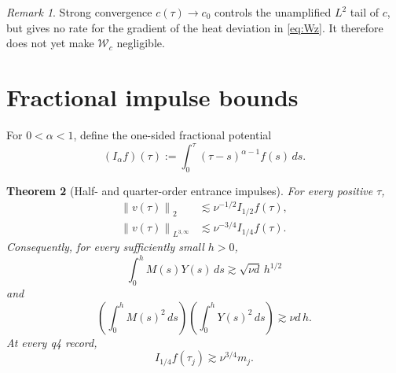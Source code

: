 \documentclass[11pt]{article}
\newtheorem{theorem}{Theorem}
\theoremstyle{remark}
\newtheorem{remark}[theorem]{Remark}
\newcommand{\norm}[1]{\left\|#1\right\|}
\begin{document}
\begin{remark}
Strong convergence \(c(\tau)\to c_0\) controls the unamplified
\(L^2\) tail of \(c\), but gives no rate for the gradient of the
heat deviation in \eqref{eq:Wz}.  It therefore does not yet make
\(\mathcal W_c\) negligible.
\end{remark}

\section{Fractional impulse bounds}

For \(0<\alpha<1\), define the one-sided fractional potential
\begin{equation}
\label{eq:Ialpha}
 (I_\alpha f)(\tau)
 :=
 \int_0^\tau(\tau-s)^{\alpha-1}f(s)\,ds.
\end{equation}

\begin{theorem}[Half- and quarter-order entrance impulses]
\label{thm:impulse}
For every positive \(\tau\),
\begin{align}
\label{eq:half-upper}
 \norm{v(\tau)}_2
 &\lesssim
 \nu^{-1/2}I_{1/2}f(\tau),\\
\label{eq:quarter-upper}
 \norm{v(\tau)}_{L^{3,\infty}}
 &\lesssim
 \nu^{-3/4}I_{1/4}f(\tau).
\end{align}
Consequently, for every sufficiently small \(h>0\),
\begin{equation}
\label{eq:L1-floor}
 \boxed{
 \int_0^hM(s)Y(s)\,ds
 \gtrsim
 \sqrt{\nu d}\,h^{1/2}
 }
\end{equation}
and
\begin{equation}
\label{eq:product-floor}
 \boxed{
 \left(\int_0^hM(s)^2\,ds\right)
 \left(\int_0^hY(s)^2\,ds\right)
 \gtrsim
 \nu d\,h.
 }
\end{equation}
At every q4 record,
\begin{equation}
\label{eq:record-impulse}
 \boxed{
 I_{1/4}f(\tau_j)
 \gtrsim
 \nu^{3/4}m_j.
 }
\end{equation}
\end{theorem}
\end{document}
